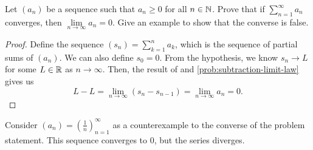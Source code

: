 \begin{problem}
  Let $(a_{n})$ be a sequence such that $a_{n} \geq 0$ for all $n \in \mathbb{N}$. 
  Prove that if $\sum\limits_{n=1}^{\infty} a_{n}$ converges, then
  $\lim\limits_{n \to \infty} a_{n} = 0$. Give an example to show that the 
  converse is false.

  \begin{proof} 
    Define the sequence $(s_{n}) = \sum\limits_{k=1}^{n} a_{k}$, which is the sequence of partial sums of $(a_{n})$.
    We can also define $s_{0} = 0$. From the hypothesis, we know $s_{n} \to L$ for some $L \in \mathbb{R}$ as $n \to \infty$.
    Then, the result of  and \ref{prob:subtraction-limit-law}
    gives us
    \[
      L - L = \lim\limits_{n \to \infty} (s_{n} - s_{n - 1}) = \lim\limits_{n \to \infty} a_{n} = 0.
    \]
  \end{proof}

  Consider $(a_{n}) = \left( \frac{1}{n} \right)_{n=1}^{\infty}$ as a counterexample to the converse
  of the problem statement. This sequence converges to $0$, but the series diverges.


\end{problem}

